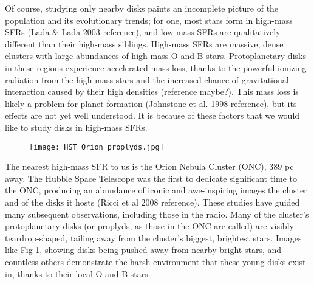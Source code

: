 Of course, studying only nearby disks paints an incomplete picture of the population and its evolutionary trends; for one, most stars form in high-mass SFRs (Lada \& Lada 2003 reference), and low-mass SFRs are qualitatively different than their high-mass siblings. High-mass SFRs are massive, dense clusters with large abundances of high-mass O and B stars. Protoplanetary disks in these regions experience accelerated mass loss, thanks to the powerful ionizing radiation from the high-mass stars and the increased chance of gravitational interaction caused by their high densities (reference maybe?). This mass loss is likely a problem for planet formation (Johnstone et al. 1998 reference), but its effects are not yet well understood. It is because of these factors that we would like to study disks in high-mass SFRs.


\begin{figure}[t!]
\centering
  \texttt{[image: HST\_Orion\_proplyds.jpg]}
  \label{fig:HST_ONC}
\end{figure}



The nearest high-mass SFR to us is the Orion Nebula Cluster (ONC), 389 pc away. The Hubble Space Telescope was the first to dedicate significant time to the ONC, producing an abundance of iconic and awe-inspiring images the cluster and of the disks it hosts (Ricci et al 2008 reference). These studies have guided many subsequent observations, including those in the radio. Many of the cluster's protoplanetary disks (or proplyds, as those in the ONC are called) are visibly teardrop-shaped, tailing away from the cluster's biggest, brightest stars. Images like Fig \ref{fig:HST_ONC}, showing disks being pushed away from nearby bright stars, and countless others demonstrate the harsh environment that these young disks exist in, thanks to their local O and B stars.

